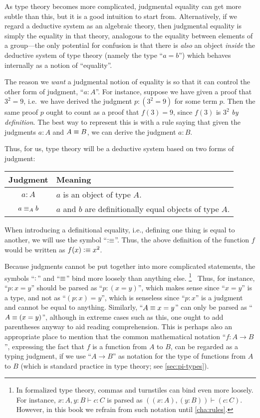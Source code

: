 As type theory becomes more complicated, judgmental equality can get more subtle than this, but it is a good intuition to start from.
Alternatively, if we regard a deductive system as an algebraic theory, then judgmental equality is simply the equality in that theory, analogous to the equality between elements of a group---the only potential for confusion is that there is \emph{also} an object \emph{inside} the deductive system of type theory (namely the type ``$a=b$'') which behaves internally as a notion of ``equality''.

The reason we \emph{want} a judgmental notion of equality is so that it can control the other form of judgment, ``$a:A$''.
For instance, suppose we have given a proof that $3^2=9$, i.e.\ we have derived the judgment $p:(3^2=9)$ for some term $p$.
Then the same proof $p$ ought to count as a proof that $f(3)=9$, since $f(3)$ is $3^2$ \emph{by definition}.
The best way to represent this is with a rule saying that given the judgments $a:A$ and $A\equiv B$, we can derive the judgment $a:B$.

Thus, for us, type theory will be a deductive system based on two forms of judgment:
\begin{center}
\begin{tabular}{c|l}
  \textbf{Judgment} & \textbf{Meaning}\\\hline
  $a : A$ & $a$ is an object of type $A$.\\
  $a \equiv_A b$ & $a$ and $b$ are definitionally equal objects of type $A$.
\end{tabular}
\end{center}
When introducing a definitional equality, i.e., defining one thing is equal to another, we will use the symbol ``$\vcentcolon\equiv$''.
Thus, the above definition of the function $f$ would be written as $f(x)\vcentcolon\equiv x^2$.

Because judgments cannot be put together into more complicated statements, the symbols ``$:$'' and ``$\equiv$'' bind more loosely than anything else.%
\footnote{In formalized type theory, commas and turnstiles can bind even more loosely.
  For instance, $x:A,y:B\vdash c:C$ is parsed as $((x:A),(y:B))\vdash (c:C)$.
  However, in this book we refrain from such notation until \autoref{cha:rules}.}\nopagebreak~
Thus, for instance, ``$p:x=y$'' should be parsed as ``$p:(x=y)$'', which makes sense since ``$x=y$'' is a type, and not as ``$(p:x)=y$'', which is senseless since ``$p:x$'' is a judgment and cannot be equal to anything.
Similarly, ``$A\equiv x=y$'' can only be parsed as ``$A\equiv(x=y)$'', although in extreme cases such as this, one ought to add parentheses anyway to aid reading comprehension.
This is perhaps also an appropriate place to mention that the common mathematical notation ``$f:A\to B$'', expressing the fact that $f$ is a function from $A$ to $B$, can be regarded as a typing judgment, if we use ``$A\to B$'' as notation for the type of functions from $A$ to $B$ (which is standard practice in type theory; see \autoref{sec:pi-types}).

